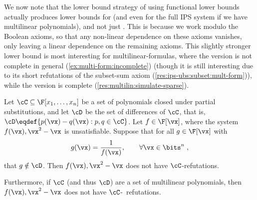 \documentclass{toc}
\begin{document}
We now note that the lower bound strategy of using functional lower bounds actually produces lower bounds for \lbIPS (and even for the full IPS system if we have multilinear polynomials), and not just \lIPS.  This is because we work modulo the Boolean axioms, so that any non-linear dependence on these axioms vanishes, only leaving a linear dependence on the remaining axioms.  This slightly stronger lower bound is most interesting for multilinear-formulas, where the \lIPS version is not complete in general (\autoref{ex:multi-form:incomplete}) (though it is still interesting due to its short refutations of the subset-sum axiom (\autoref{res:ips-ubs:subset:mult-form})), while the \lbIPS version is complete (\autoref{res:multilin:simulate-sparse}).

\begin{lemma}\label{res:lbs-fn_lbs-ips:lbIPS}
        Let $\cC\subseteq\F[x_1,\ldots,x_n]$ be a set of polynomials closed under partial substitutions, and let $\cD$ be the set of differences of $\cC$, that is, $\cD\eqdef \{p(\vx)-q(\vx): p,q\in\cC\}$. Let $f\in\F[\vx]$, where the system $f(\vx),\vx^2-\vx$ is unsatisfiable.  Suppose that for all $g\in\F[\vx]$ with
        \[
                g(\vx)=\frac{1}{f(\vx)},\qquad \forall \vx\in\bits^n\;,
        \]
        that $g\notin \cD$.  Then $f(\vx),\vx^2-\vx$ does not have $\cC$-\lbIPS refutations.

        Furthermore, if $\cC$ (and thus $\cD$) are a set of multilinear polynomials, then $f(\vx),\vx^2-\vx$ does not have $\cC$-\IPS\ refutations.
\end{lemma}
\end{document}

